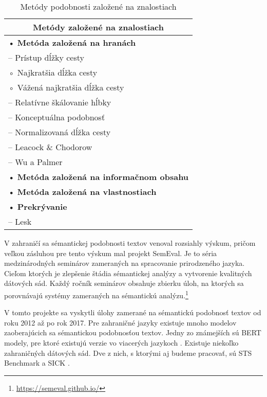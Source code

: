 \begin{table}[H]
    \centering
    \renewcommand{\arraystretch}{1.2}
    \begin{tabular}{|l|}
        \hline
        \multicolumn{1}{|c|}{\textbf{Metódy založené na znalostiach}} \\
        \hline
        • \textbf{Metóda založená na hranách} \\
        \quad – Prístup dĺžky cesty \\
        \quad\quad ◦ Najkratšia dĺžka cesty \\
        \quad\quad ◦ Vážená najkratšia dĺžka cesty \\
        \quad – Relatívne škálovanie hĺbky \\
        \quad – Konceptuálna podobnosť \\
        \quad – Normalizovaná dĺžka cesty \\
        \quad – Leacock \& Chodorow \\
        \quad – Wu a Palmer \\
        • \textbf{Metóda založená na informačnom obsahu} \\
        • \textbf{Metóda založená na vlastnostiach} \\
        • \textbf{Prekrývanie} \\
        \quad – Lesk \\
        \hline
    \end{tabular}
\caption{Metódy podobnosti založené na znalostiach}
\label{kap:knowledge_based_methods}
\end{table}

V zahraničí sa sémantickej podobnosti textov venoval rozsiahly výskum, pričom veľkou zásluhou pre tento výskum mal projekt SemEval. Je to séria medzinárodných seminárov zameraných na spracovanie prirodzeného jazyka. Cieľom ktorých je zlepšenie štádia sémantickej analýzy a vytvorenie kvalitných dátových sád. Každý ročník seminárov obsahuje zbierku úloh, na ktorých sa porovnávajú systémy zameraných na sémantickú analýzu.\footnote{\url{https://semeval.github.io/}} \cite{2015-semeval}

V tomto projekte sa vyskytli úlohy zamerané na sémantickú podobnosť textov od roku 2012 až po rok 2017. Pre zahraničné jazyky existuje mnoho modelov zaoberajúcich sa sémantickou podobnosťou textov. Jedny zo známejších sú BERT modely, pre ktoré existujú verzie vo viacerých jazykoch \cite{dutchbert, alberto, camembert}. Existuje niekoľko zahraničných dátových sád. Dve z nich, s ktorými aj budeme pracovať, sú STS Benchmark a SICK \cite{stsbenchmark1, sick}.


